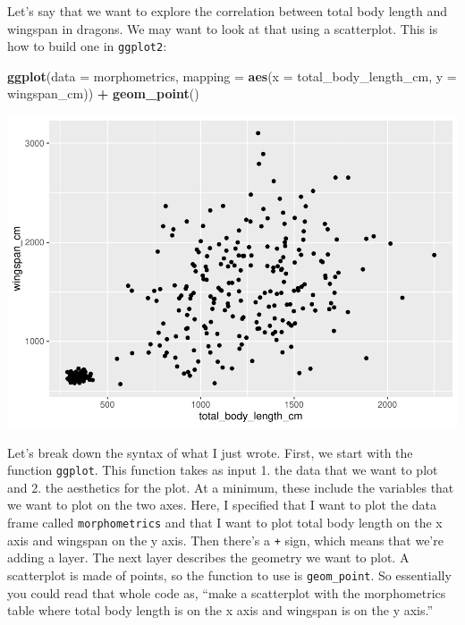\documentclass[
]{book}
\newenvironment{Shaded}{\begin{snugshade}}{\end{snugshade}}
\newcommand{\AttributeTok}[1]{\textcolor[rgb]{0.13,0.29,0.53}{#1}}
\newcommand{\FunctionTok}[1]{\textcolor[rgb]{0.13,0.29,0.53}{\textbf{#1}}}
\newcommand{\NormalTok}[1]{#1}
\newcommand{\SpecialCharTok}[1]{\textcolor[rgb]{0.81,0.36,0.00}{\textbf{#1}}}
\begin{document}
Let's say that we want to explore the correlation between total body length and
wingspan in dragons. We may want to look at that using a scatterplot. This is
how to build one in \texttt{ggplot2}:

\begin{Shaded}
\begin{Highlighting}[]
\FunctionTok{ggplot}\NormalTok{(}\AttributeTok{data =}\NormalTok{ morphometrics, }
       \AttributeTok{mapping =} \FunctionTok{aes}\NormalTok{(}\AttributeTok{x =}\NormalTok{ total\_body\_length\_cm, }\AttributeTok{y =}\NormalTok{ wingspan\_cm)) }\SpecialCharTok{+}
  \FunctionTok{geom\_point}\NormalTok{()}
\end{Highlighting}
\end{Shaded}

\includegraphics{reproducible-science_files/figure-latex/gg3-1.pdf}

Let's break down the syntax of what I just wrote. First, we start with the
function \texttt{ggplot}. This function takes as input 1. the data that we want to plot
and 2. the aesthetics for the plot. At a minimum, these include the variables
that we want to plot on the two axes. Here, I specified that I want to plot the
data frame called \texttt{morphometrics} and that I want to plot total body length on
the x axis and wingspan on the y axis. Then there's a \texttt{+} sign, which means that
we're adding a layer. The next layer describes the geometry we want to plot. A
scatterplot is made of points, so the function to use is \texttt{geom\_point}. So
essentially you could read that whole code as, ``make a scatterplot with the
morphometrics table where total body length is on the x axis and wingspan is on
the y axis.''
\end{document}
